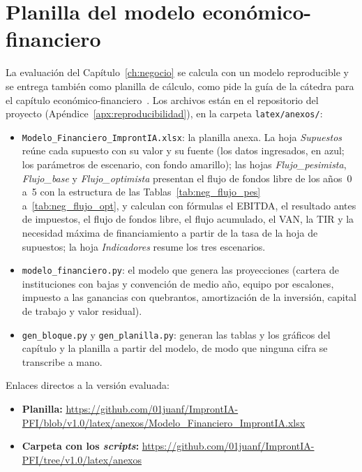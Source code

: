 \chapter{Planilla del modelo económico-financiero}
\label{apx:modelo_financiero}

La evaluación del Capítulo~\ref{ch:negocio} se calcula con un modelo reproducible y se entrega también como planilla de cálculo, como pide la guía de la cátedra para el capítulo económico-financiero~\parencite{UADE2026ModeloNegocio}. Los archivos están en el repositorio del proyecto (Apéndice~\ref{apx:reproducibilidad}), en la carpeta \texttt{latex/anexos/}:

\begin{itemize}
    \item \texttt{Modelo\_Financiero\_ImprontIA.xlsx}: la planilla anexa. La hoja \textit{Supuestos} reúne cada supuesto con su valor y su fuente (los datos ingresados, en azul; los parámetros de escenario, con fondo amarillo); las hojas \textit{Flujo\_pesimista}, \textit{Flujo\_base} y \textit{Flujo\_optimista} presentan el flujo de fondos libre de los años~0 a~5 con la estructura de las Tablas~\ref{tab:neg_flujo_pes} a~\ref{tab:neg_flujo_opt}, y calculan con fórmulas el EBITDA, el resultado antes de impuestos, el flujo de fondos libre, el flujo acumulado, el VAN, la TIR y la necesidad máxima de financiamiento a partir de la tasa de la hoja de supuestos; la hoja \textit{Indicadores} resume los tres escenarios.
    \item \texttt{modelo\_financiero.py}: el modelo que genera las proyecciones (cartera de instituciones con bajas y convención de medio año, equipo por escalones, impuesto a las ganancias con quebrantos, amortización de la inversión, capital de trabajo y valor residual).
    \item \texttt{gen\_bloque.py} y \texttt{gen\_planilla.py}: generan las tablas y los gráficos del capítulo y la planilla a partir del modelo, de modo que ninguna cifra se transcribe a mano.
\end{itemize}

Enlaces directos a la versión evaluada:

\begin{itemize}
    \item \textbf{Planilla:} \url{https://github.com/01juanf/ImprontIA-PFI/blob/v1.0/latex/anexos/Modelo_Financiero_ImprontIA.xlsx}
    \item \textbf{Carpeta con los \textit{scripts}:} \url{https://github.com/01juanf/ImprontIA-PFI/tree/v1.0/latex/anexos}
\end{itemize}


